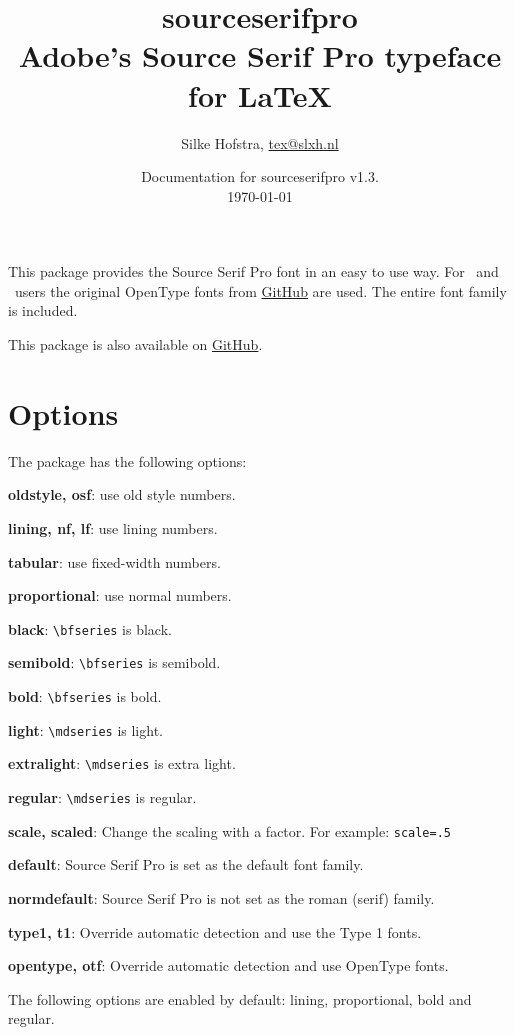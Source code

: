 \documentclass[10pt,a4paper,english]{article}
\title{\bfseries
	\Huge sourceserifpro\\
	\Large Adobe's Source Serif Pro typeface for \LaTeX
}
\author{Silke Hofstra, \href{mailto:tex@slxh.nl}{tex@slxh.nl}}
\date{Documentation for sourceserifpro v1.3.\\ \today}
\begin{document}
\maketitle
\begin{multicols}{2}
This package provides the Source Serif Pro font in an easy to use way. For \XeLaTeX\ and \LuaLaTeX\ users the original OpenType fonts from \href{https://github.com/adobe-fonts/source-serif-pro}{GitHub} are used. The entire font family is included.

This package is also available on \href{https://github.com/silkeh/latex-sourceserifpro}{GitHub}.

\section{Options}
The package has the following options:
\begin{itemize*}
	\item \textbf{oldstyle, osf}:  use old style numbers.
	\item \textbf{lining, nf, lf}: use lining numbers.
	\item \textbf{tabular}:        use fixed-width numbers.
	\item \textbf{proportional}:   use normal numbers.
	\item \textbf{black}:          \texttt{\textbackslash bfseries} is black.
	\item \textbf{semibold}:       \texttt{\textbackslash bfseries} is semibold.
	\item \textbf{bold}:           \texttt{\textbackslash bfseries} is bold.
	\item \textbf{light}:          \texttt{\textbackslash mdseries} is light.
	\item \textbf{extralight}:     \texttt{\textbackslash mdseries} is extra light.
	\item \textbf{regular}:        \texttt{\textbackslash mdseries} is regular.
	\item \textbf{scale, scaled}:  Change the scaling with a factor. For example:  \texttt{scale=.5}
	\item \textbf{default}:        Source Serif Pro is set as the default font family.
	\item \textbf{normdefault}:    Source Serif Pro is not set as the roman (serif) family.
	\item \textbf{type1, t1}:      Override automatic detection and use the Type 1 fonts.
	\item \textbf{opentype, otf}:  Override automatic detection and use OpenType fonts.
\end{itemize*}
The following options are enabled by default: lining, proportional, bold and regular.


\end{multicols}
\end{document}
